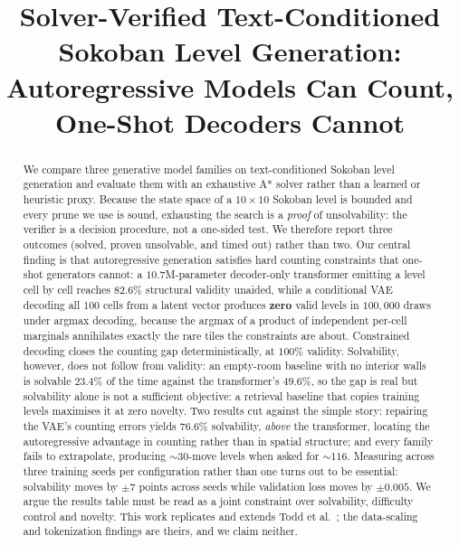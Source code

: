 \documentclass[conference]{IEEEtran}
\begin{document}
\title{Solver-Verified Text-Conditioned Sokoban Level Generation:\\
Autoregressive Models Can Count, One-Shot Decoders Cannot}

\author{
\and
{}
}

\maketitle

\begin{abstract}
We compare three generative model families on text-conditioned Sokoban level
generation and evaluate them with an exhaustive A* solver rather than a learned
or heuristic proxy. Because the state space of a $10\times10$ Sokoban level is
bounded and every prune we use is sound, exhausting the search is a
\emph{proof} of unsolvability: the verifier is a decision procedure, not a
one-sided test. We therefore report three outcomes (solved, proven
unsolvable, and timed out) rather than two. Our central finding is that
autoregressive generation satisfies hard counting constraints that one-shot
generators cannot: a $10.7$M-parameter decoder-only transformer emitting a level
cell by cell reaches $82.6\%$ structural validity unaided, while a conditional
VAE decoding all $100$ cells from a latent vector produces \textbf{zero} valid
levels in $100{,}000$ draws under argmax decoding, because the argmax of a
product of independent per-cell marginals annihilates exactly the rare tiles the
constraints are about. Constrained decoding closes the counting gap
deterministically, at $100\%$ validity. Solvability, however, does not follow
from validity: an empty-room baseline with no interior walls is solvable
$23.4\%$ of the time against the transformer's $49.6\%$, so the gap is real but
solvability alone is not a sufficient objective: a retrieval baseline that
copies training levels maximises it at zero novelty. Two results cut against the
simple story: repairing the VAE's counting errors yields $76.6\%$ solvability,
\emph{above} the transformer, locating the autoregressive advantage in counting
rather than in spatial structure; and every family fails to extrapolate,
producing $\sim\!30$-move levels when asked for $\sim\!116$. Measuring across
three training seeds per configuration rather than one turns out to be
essential: solvability moves by $\pm 7$ points across seeds while validation
loss moves by $\pm 0.005$. We argue the results table must be read as a joint constraint over
solvability, difficulty control and novelty. This work replicates and extends
Todd et al.~\cite{todd2023level}; the data-scaling and tokenization findings are
theirs, and we claim neither.
\end{abstract}
\end{document}
